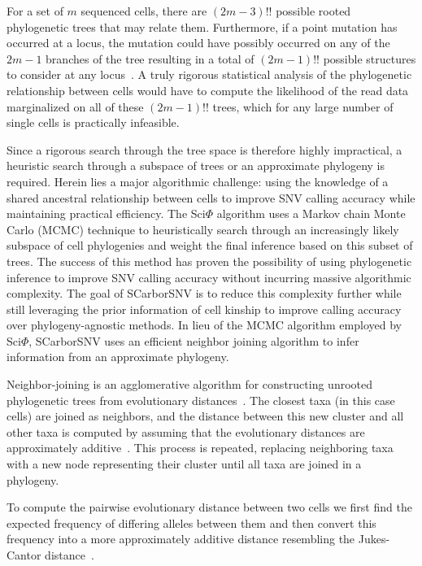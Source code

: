 \documentclass[../../main.tex]{subfiles}
\begin{document}
For a set of $m$ sequenced cells, there are $(2m-3)!!$ possible rooted phylogenetic trees that may relate them.
Furthermore, if a point mutation has occurred at a locus, the mutation could have possibly occurred on any of the $2m-1$  branches of the tree resulting in a total of $(2m-1)!!$ possible structures to consider at any locus~\cite{BSA}.
A truly rigorous statistical analysis of the phylogenetic relationship between cells would have to compute the likelihood of the read data marginalized on all of these $(2m-1)!!$ trees, which for any large number of single cells is practically infeasible.

Since a rigorous search through the tree space is therefore highly impractical, a heuristic search through a subspace of trees or an approximate phylogeny is required.
Herein lies a major algorithmic challenge: using the knowledge of a shared ancestral relationship between cells to improve SNV calling accuracy while maintaining practical efficiency.
The Sci$\Phi$ algorithm uses a Markov chain Monte Carlo (MCMC) technique to heuristically search through an increasingly likely subspace of cell phylogenies and weight the final inference based on this subset of trees.
The success of this method has proven the possibility of using phylogenetic inference to improve SNV calling accuracy without incurring massive algorithmic complexity.
The goal of SCarborSNV is to reduce this complexity further while still leveraging the prior information of cell kinship to improve calling accuracy over phylogeny-agnostic methods.
In lieu of the MCMC algorithm employed by Sci$\Phi$, SCarborSNV uses an efficient neighbor joining algorithm to infer information from an approximate phylogeny.

Neighbor-joining is an agglomerative algorithm for constructing unrooted phylogenetic trees from evolutionary distances~\cite{NJ}.
The closest taxa (in this case cells) are joined as neighbors, and the distance between this new cluster and all other taxa is computed by assuming that the evolutionary distances are approximately additive~\cite{BSA}.
This process is repeated, replacing neighboring taxa with a new node representing their cluster until all taxa are joined in a phylogeny.

To compute the pairwise evolutionary distance between two cells we first find the expected frequency of differing alleles between them and then convert this frequency into a more approximately additive distance resembling the Jukes-Cantor distance~\cite{JC, BSA}.
\end{document}
